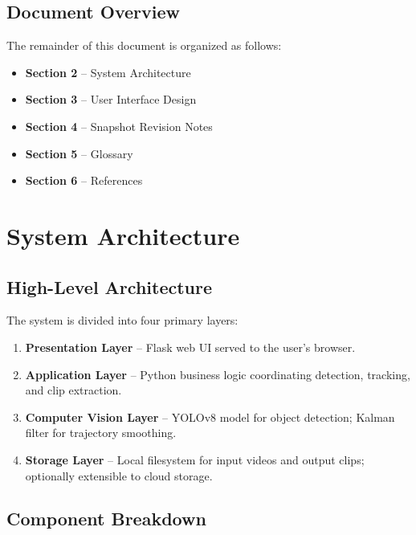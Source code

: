 \documentclass[12pt]{article}
\begin{document}
\subsection{Document Overview}
The remainder of this document is organized as follows:
\begin{itemize}[noitemsep]
    \item \textbf{Section 2} -- System Architecture
    \item \textbf{Section 3} -- User Interface Design
    \item \textbf{Section 4} -- Snapshot Revision Notes
    \item \textbf{Section 5} -- Glossary
    \item \textbf{Section 6} -- References
\end{itemize}

\newpage

\section{System Architecture}

\subsection{High-Level Architecture}
The system is divided into four primary layers:

\begin{enumerate}[noitemsep]
    \item \textbf{Presentation Layer} -- Flask web UI served to the user's browser.
    \item \textbf{Application Layer} -- Python business logic coordinating detection,
          tracking, and clip extraction.
    \item \textbf{Computer Vision Layer} -- YOLOv8 model for object detection;
          Kalman filter for trajectory smoothing.
    \item \textbf{Storage Layer} -- Local filesystem for input videos and output clips;
          optionally extensible to cloud storage.
\end{enumerate}

\subsection{Component Breakdown}
\end{document}
